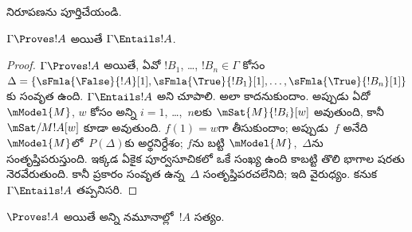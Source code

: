 \documentclass[../../../include/open-logic-section]{subfiles}
\begin{document}
\begin{prob}
 నిరూపణను పూర్తిచేయండి.
\end{prob}

\begin{cor}
$\Gamma \Proves !A$ అయితే $\Gamma \Entails !A$.
\end{cor}

\begin{proof}
  $\Gamma \Proves !A$ అయితే, ఏవో $!B_1$, \dots,
  $!B_n \in \Gamma$ కోసం $\Delta =
  \{\sFmla{\False}{!A}[1], \sFmla{\True}{!B_1}[1],
  \dots, \sFmla{\True}{!B_n}[1]\}$కు సంవృత
   ఉంది. $\Gamma \Entails !A$
  అని చూపాలి. అలా కాదనుకుందాం. అప్పుడు ఏదో
  $\mModel{M}$, $w$ కోసం అన్ని $i=1$, \dots,~$n$లకు
  $\mSat{M}{!B_i}[w]$ అవుతుంది, కానీ $\mSat/{M}{!A}[w]$ కూడా అవుతుంది.
  $f(1) = w$గా తీసుకుందాం; అప్పుడు~$f$ అనేది
  $\mModel{M}$లో~$P(\Delta)$కు అర్థనిర్దేశం; $f$ను బట్టి
  $\mModel{M}$,~$\Delta$ను సంతృప్తిపరుస్తుంది. ఇక్కడ ఏకైక
  పూర్వసూచికలో ఒకే సంఖ్య ఉంది కాబట్టి తొలి భాగాల షరతు నెరవేరుతుంది. కానీ
   ప్రకారం సంవృత
   ఉన్న~$\Delta$
  సంతృప్తిపరచలేనిది; ఇది వైరుధ్యం. కనుక
  $\Gamma \Entails !A$ తప్పనిసరి.
\end{proof}

\begin{cor}
$\Proves !A$ అయితే అన్ని నమూనాల్లో~$!A$ సత్యం.
\end{cor}
\end{document}
